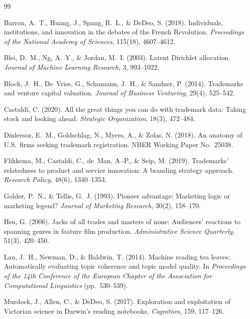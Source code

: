 \begin{thebibliography}{99}

Barron, A.~T., Huang, J., Spang, R.~L., \& DeDeo, S. (2018). Individuals,
institutions, and innovation in the debates of the French Revolution.
\emph{Proceedings of the National Academy of Sciences}, 115(18),
4607--4612.

Blei, D.~M., Ng, A.~Y., \& Jordan, M.~I. (2003). Latent Dirichlet
allocation. \emph{Journal of Machine Learning Research}, 3, 993--1022.

Block, J.~H., De~Vries, G., Schumann, J.~H., \& Sandner, P. (2014).
Trademarks and venture capital valuation. \emph{Journal of Business
Venturing}, 29(4), 525--542.

Castaldi, C. (2020). All the great things you can do with trademark data:
Taking stock and looking ahead. \emph{Strategic Organization}, 18(3),
472--484.

Dinlersoz, E.~M., Goldschlag, N., Myers, A., \& Zolas, N. (2018). An
anatomy of U.S.\ firms seeking trademark registration. NBER Working Paper
No.\ 25038.

Flikkema, M., Castaldi, C., de~Man, A.-P., \& Seip, M. (2019). Trademarks'
relatedness to product and service innovation: A branding strategy
approach. \emph{Research Policy}, 48(6), 1340--1353.

Golder, P.~N., \& Tellis, G.~J. (1993). Pioneer advantage: Marketing logic or
marketing legend? \emph{Journal of Marketing Research}, 30(2), 158--170.

Hsu, G. (2006). Jacks of all trades and masters of none: Audiences'
reactions to spanning genres in feature film production.
\emph{Administrative Science Quarterly}, 51(3), 420--450.

Lau, J.~H., Newman, D., \& Baldwin, T. (2014). Machine reading tea leaves:
Automatically evaluating topic coherence and topic model quality. In
\emph{Proceedings of the 14th Conference of the European Chapter of the
Association for Computational Linguistics} (pp.~530--539).

Murdock, J., Allen, C., \& DeDeo, S. (2017). Exploration and exploitation
of Victorian science in Darwin's reading notebooks. \emph{Cognition},
159, 117--126.


\end{thebibliography}
